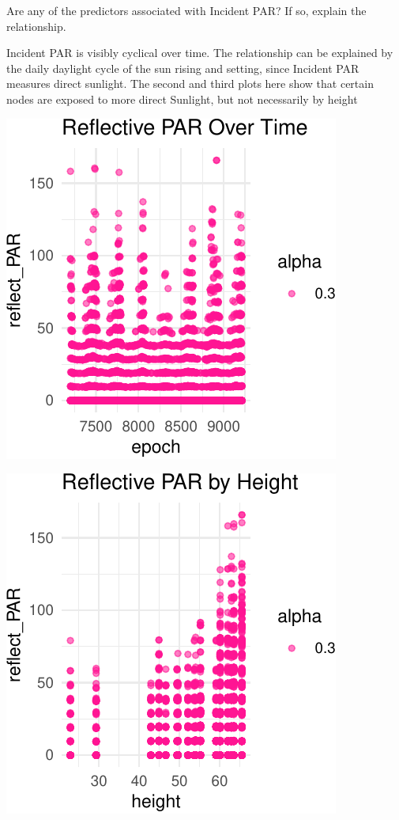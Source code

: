 \documentclass[]{article}
\begin{document}
Are any of the predictors associated with Incident PAR? If so, explain
the relationship.

Incident PAR is visibly cyclical over time. The relationship can be
explained by the daily daylight cycle of the sun rising and setting,
since Incident PAR measures direct sunlight. The second and third plots
here show that certain nodes are exposed to more direct Sunlight, but
not necessarily by height

\begin{center}\includegraphics{Project1WriteUp_files/figure-latex/unnamed-chunk-14-1} \end{center}

\begin{center}\includegraphics{Project1WriteUp_files/figure-latex/unnamed-chunk-14-2} \end{center}
\end{document}
